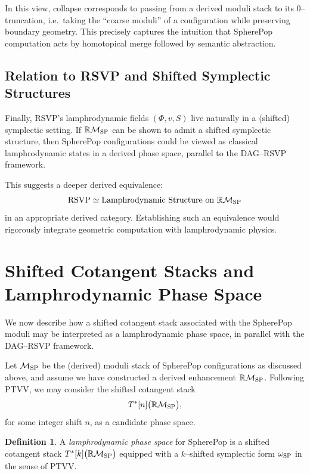 \documentclass[12pt]{article}
\theoremstyle{plain}
\theoremstyle{definition}
\newtheorem{definition}[theorem]{Definition}
\theoremstyle{remark}
\begin{document}
In this view, collapse corresponds to passing from a derived moduli stack to
its $0$--truncation, i.e.\ taking the ``coarse moduli'' of a configuration
while preserving boundary geometry. This precisely captures the intuition that
SpherePop computation acts by homotopical merge followed by semantic
abstraction.


\subsection{Relation to RSVP and Shifted Symplectic Structures}

Finally, RSVP’s lamphrodynamic fields $(\Phi,v,S)$ live naturally in a
(shifted) symplectic setting. If $\mathbb{R}\mathcal{M}_{\rm SP}$ can be shown
to admit a shifted symplectic structure, then SpherePop configurations could be
viewed as classical lamphrodynamic states in a derived phase space, parallel to
the DAG--RSVP framework.

This suggests a deeper derived equivalence:
\[
    \mathrm{RSVP}
    \simeq
    \text{Lamphrodynamic Structure on }
    \mathbb{R}\mathcal{M}_{\rm SP}
\]
in an appropriate derived category. Establishing such an equivalence would
rigorously integrate geometric computation with lamphrodynamic physics.

\newpage

\section{Shifted Cotangent Stacks and Lamphrodynamic Phase Space}

We now describe how a shifted cotangent stack associated with the SpherePop
moduli may be interpreted as a lamphrodynamic phase space, in parallel with the
DAG--RSVP framework.

Let $\mathcal{M}_{\rm SP}$ be the (derived) moduli stack of SpherePop
configurations as discussed above, and assume we have constructed a derived
enhancement $\mathbb{R}\mathcal{M}_{\rm SP}$. Following PTVV, we may consider
the shifted cotangent stack
\[
    T^\ast[n]\big( \mathbb{R}\mathcal{M}_{\rm SP} \big),
\]
for some integer shift $n$, as a candidate phase space.

\begin{definition}
A \emph{lamphrodynamic phase space} for SpherePop is a shifted cotangent stack
$T^\ast[k]\big(\mathbb{R}\mathcal{M}_{\rm SP}\big)$ equipped with a $k$--shifted
symplectic form $\omega_{\rm SP}$ in the sense of PTVV.
\end{definition}
\end{document}
